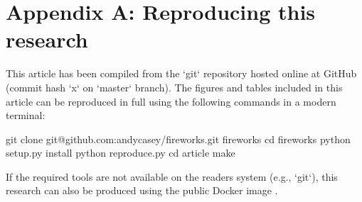 \documentclass[useAMS,usenatbib]{mn2e}
\begin{document}
\label{lastpage}

\section{Appendix A: Reproducing this research}
This article has been compiled from the `git` repository hosted online at GitHub (commit hash `x` on `master` branch). The figures and tables included in this article can be reproduced in full using the following commands in a modern terminal:

git clone git@github.com:andycasey/fireworks.git fireworks
cd fireworks
python setup.py install
python reproduce.py
cd article
make

If the required tools are not available on the readers system (e.g., `git`), this research can also be produced using the public Docker image .
\end{document}
